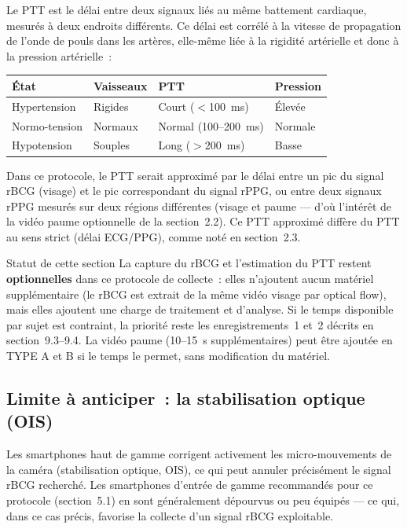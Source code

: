 \documentclass[11pt,a4paper]{article}
\begin{document}
Le PTT est le d\'elai entre deux signaux li\'es au m\^eme battement
cardiaque, mesur\'es \`a deux endroits diff\'erents. Ce d\'elai est
corr\'el\'e \`a la vitesse de propagation de l'onde de pouls dans les
art\`eres, elle-m\^eme li\'ee \`a la rigidit\'e art\'erielle et donc \`a la
pression art\'erielle~:

\begin{center}
\begin{tabularx}{\textwidth}{P{2.8cm} P{2.8cm} P{2.8cm} X}
\toprule
\textbf{\'Etat} & \textbf{Vaisseaux} & \textbf{PTT} & \textbf{Pression} \\
\midrule
Hypertension & Rigides & Court ($<$100~ms) & \'Elev\'ee \\
Normo-tension & Normaux & Normal (100--200~ms) & Normale \\
Hypotension & Souples & Long ($>$200~ms) & Basse \\
\bottomrule
\end{tabularx}
\end{center}

Dans ce protocole, le PTT serait approxim\'e par le d\'elai entre un pic du
signal rBCG (visage) et le pic correspondant du signal rPPG, ou entre deux
signaux rPPG mesur\'es sur deux r\'egions diff\'erentes (visage et paume ---
d'o\`u l'int\'er\^et de la vid\'eo paume optionnelle de la section~2.2). Ce
PTT approxim\'e diff\`ere du PTT au sens strict (d\'elai ECG/PPG), comme
not\'e en section~2.3.

\begin{warnbox}{Statut de cette section}
La capture du rBCG et l'estimation du PTT restent \textbf{optionnelles} dans
ce protocole de collecte~: elles n'ajoutent aucun mat\'eriel suppl\'ementaire
(le rBCG est extrait de la m\^eme vid\'eo visage par optical flow), mais
elles ajoutent une charge de traitement et d'analyse. Si le temps disponible
par sujet est contraint, la priorit\'e reste les enregistrements~1 et~2
d\'ecrits en section~9.3--9.4. La vid\'eo paume (10--15~s suppl\'ementaires)
peut \^etre ajout\'ee en TYPE A et B si le temps le permet, sans
modification du mat\'eriel.
\end{warnbox}

\subsection{Limite \`a anticiper~: la stabilisation optique (OIS)}

Les smartphones haut de gamme corrigent activement les micro-mouvements de
la cam\'era (stabilisation optique, OIS), ce qui peut annuler pr\'ecis\'ement
le signal rBCG recherch\'e. Les smartphones d'entr\'ee de gamme
recommand\'es pour ce protocole (section~5.1) en sont g\'en\'eralement
d\'epourvus ou peu \'equip\'es --- ce qui, dans ce cas pr\'ecis, favorise la
collecte d'un signal rBCG exploitable.
\end{document}
